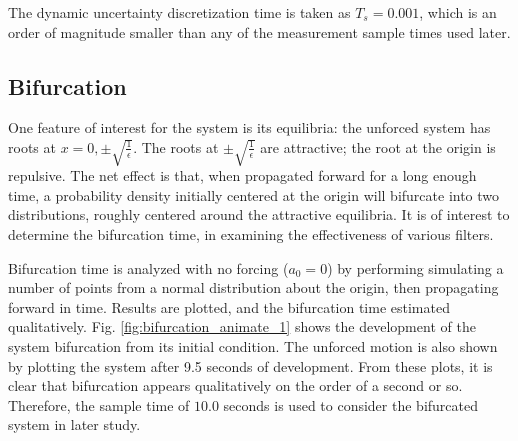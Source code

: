 \documentclass[]{article}
\begin{document}
The dynamic uncertainty discretization time is taken as $T_s = 0.001$, which is an order of magnitude smaller than any of the measurement sample times used later.

\subsection{Bifurcation}

One feature of interest for the system is its equilibria: the unforced system has roots at $x = 0, \pm \sqrt{\frac{1}{\epsilon}}$. The roots at $\pm \sqrt{\frac{1}{\epsilon}}$ are attractive; the root at the origin is repulsive. The net effect is that, when propagated forward for a long enough time, a probability density initially centered at the origin will bifurcate into two distributions, roughly centered around the attractive equilibria. It is of interest to determine the bifurcation time, in examining the effectiveness of various filters.

Bifurcation time is analyzed with no forcing ($a_0 = 0$) by performing simulating a number of points from a normal distribution about the origin, then propagating forward in time. Results are plotted, and the bifurcation time estimated qualitatively. Fig. \ref{fig:bifurcation_animate_1} shows the development of the system bifurcation from its initial condition. The unforced motion is also shown by plotting the system after 9.5 seconds of development. From these plots, it is clear that bifurcation appears qualitatively on the order of a second or so. Therefore, the sample time of $10.0$ seconds is used to consider the bifurcated system in later study.
\end{document}
